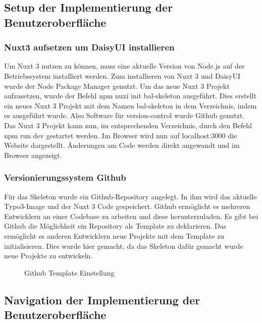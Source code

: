 \subsection{Setup der Implementierung der Benutzeroberfläche}
\label{sec:Setup der ImplementierungBenutzeroberflaeche}

\subsubsection{Nuxt3 aufsetzen um DaisyUI installieren}
\label{sec:Nuxt3 aufsetzen um DaisyUI installieren}
Um Nuxt 3 nutzen zu können, muss eine aktuelle Version von Node.js auf der Betriebssystem installiert werden. Zum installieren von Nuxt 3 und DaisyUI wurde der Node Package Manager genutzt. Um das neue Nuxt 3 Projekt aufzusetzen, wurde der Befehl npm nuxi init bal-skeleton ausgeführt. Dies erstellt ein neues Nuxt 3 Projekt mit dem Namen bal-skeleton in dem Verzeichnis, indem es ausgeführt wurde. Also Software für version-control wurde Github genutzt. Das Nuxt 3 Projekt kann nun, im entsprechenden Verzeichnis, durch den Befehl npm run dev gestartet werden. Im Browser wird nun auf localhost:3000 die Website dargestellt. Änderungen am Code werden direkt angewandt und im Browser angezeigt.

\subsubsection{Versionierungssystem Github}
\label{sec:Versionierungssystem Github}

Für das Skeleton wurde ein Github-Repository angelegt. In ihm wird das aktuelle Typo3-Image und der Nuxt 3 Code gespeichert. Github ermöglicht es mehreren Entwicklern an einer Codebase zu arbeiten und diese herunterzuladen. Es gibt bei Github die Möglichkeit ein Repository als Template zu deklarieren. Das ermöglicht es anderen Entwicklern neue Projekte mit dem Template zu initialisieren. Dies wurde hier gemacht, da das Skeleton dafür gemacht wurde neue Projekte zu entwickeln.

\begin{figure}[htb]
\centering
{}
\caption{Github Template Einstellung}
\label{fig:Github Template Einstellung}
\end{figure}

\subsection{Navigation der Implementierung der Benutzeroberfläche}
\label{sec:Navigation der der ImplementierungBenutzeroberflaeche}


